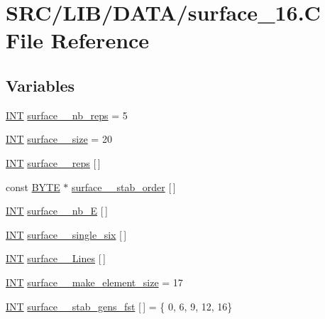 \hypertarget{surface__16_8_c}{}\section{S\+R\+C/\+L\+I\+B/\+D\+A\+T\+A/surface\+\_\+16.C File Reference}
\label{surface__16_8_c}
\subsection*{Variables}
\begin{DoxyCompactItemize}
\item 
\mbox{\hyperlink{galois_8h_a09fddde158a3a20bd2dcadb609de11dc}{I\+NT}} \mbox{\hyperlink{surface__16_8_c_a6096264127dc3007195caf0d831434ec}{surface\+\_\+\_\+nb\+\_\+reps}} = 5
\item 
\mbox{\hyperlink{galois_8h_a09fddde158a3a20bd2dcadb609de11dc}{I\+NT}} \mbox{\hyperlink{surface__16_8_c_aff01077f4ac65cc65e7494050df52106}{surface\+\_\+\_\+size}} = 20
\item 
\mbox{\hyperlink{galois_8h_a09fddde158a3a20bd2dcadb609de11dc}{I\+NT}} \mbox{\hyperlink{surface__16_8_c_a3ace9c3a8f9e2621d5ba1d6431335023}{surface\+\_\+\_\+reps}} \mbox{[}$\,$\mbox{]}
\item 
const \mbox{\hyperlink{galois_8h_ab6cc7b4aeb6ea31aba2b3fbfc83ff5e6}{B\+Y\+TE}} $\ast$ \mbox{\hyperlink{surface__16_8_c_aaac2c3eb182f3ae12b1376fd55acb212}{surface\+\_\+\_\+stab\+\_\+order}} \mbox{[}$\,$\mbox{]}
\item 
\mbox{\hyperlink{galois_8h_a09fddde158a3a20bd2dcadb609de11dc}{I\+NT}} \mbox{\hyperlink{surface__16_8_c_aa4e9cd8c890514d11d013cccf65512d2}{surface\+\_\+\_\+nb\+\_\+E}} \mbox{[}$\,$\mbox{]}
\item 
\mbox{\hyperlink{galois_8h_a09fddde158a3a20bd2dcadb609de11dc}{I\+NT}} \mbox{\hyperlink{surface__16_8_c_a9639a210426db81ee6d54a8170d82b57}{surface\+\_\+\_\+single\+\_\+six}} \mbox{[}$\,$\mbox{]}
\item 
\mbox{\hyperlink{galois_8h_a09fddde158a3a20bd2dcadb609de11dc}{I\+NT}} \mbox{\hyperlink{surface__16_8_c_a6bcea8b274d3ae878e0358a5cb0d39d6}{surface\+\_\+\_\+\+Lines}} \mbox{[}$\,$\mbox{]}
\item 
\mbox{\hyperlink{galois_8h_a09fddde158a3a20bd2dcadb609de11dc}{I\+NT}} \mbox{\hyperlink{surface__16_8_c_ac5e79b43f043b3389e848a13bb577b6c}{surface\+\_\+\_\+make\+\_\+element\+\_\+size}} = 17
\item 
\mbox{\hyperlink{galois_8h_a09fddde158a3a20bd2dcadb609de11dc}{I\+NT}} \mbox{\hyperlink{surface__16_8_c_ac76e08059f832e3c562ebb65ede46858}{surface\+\_\+\_\+stab\+\_\+gens\+\_\+fst}} \mbox{[}$\,$\mbox{]} = \{ 0, 6, 9, 12, 16\}

\end{DoxyCompactItemize}
